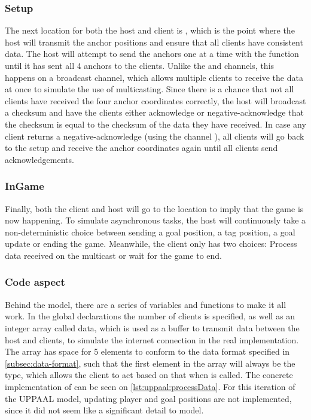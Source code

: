 \subsubsection{Setup}
The next location for both the host and client is , which is the point where the host will transmit the anchor positions and ensure that all clients have consistent data.
The host will attempt to send the anchors one at a time with the  function until it has sent all 4 anchors to the clients.
Unlike the  and  channels, this happens on a broadcast channel, which allows multiple clients to receive the data at once to simulate the use of multicasting.
Since there is a chance that not all clients have received the four anchor coordinates correctly, the host will broadcast a checksum and have the clients either acknowledge or negative-acknowledge that the checksum is equal to the checksum of the data they have received.
In case any client returns a negative-acknowledge (using the channel ), all clients will go back to the setup and receive the anchor coordinates again until all clients send acknowledgements.

\subsubsection{InGame}
Finally, both the client and host will go to the  location to imply that the game is now happening.
To simulate asynchronous tasks, the host will continuously take a non-deterministic choice between sending a goal position, a tag position, a goal update or ending the game.
Meanwhile, the client only has two choices: Process data received on the multicast or wait for the game to end.

\subsubsection{Code aspect}
Behind the model, there are a series of variables and functions to make it all work.
In the global declarations the number of clients is specified, as well as an integer array called data, which is used as a buffer to transmit data between the host and clients, to simulate the internet connection in the real implementation.
The array has space for 5 elements to conform to the data format specified in \autoref{subsec:data-format}, such that the first element in the array will always be the type, which allows the client to act based on that when  is called.
The concrete implementation of  can be seen on \autoref{lst:uppaal:processData}.
For this iteration of the UPPAAL model, updating player and goal positions are not implemented, since it did not seem like a significant detail to model.

